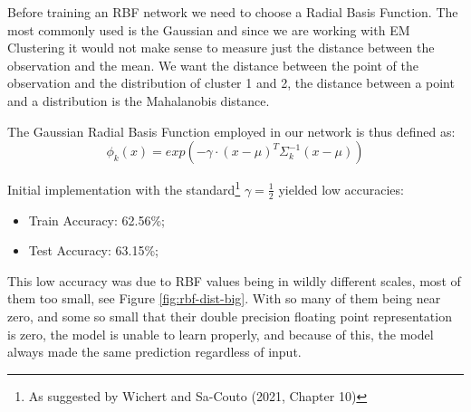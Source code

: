 \documentclass[11pt]{article}
\begin{document}
Before training an RBF network we need to choose a Radial Basis Function. The 
most commonly used is the Gaussian and since we are working with EM Clustering
it would not make sense to measure just the distance between the observation and
the mean. We want the distance between the point of the observation and the
distribution of cluster 1 and 2, the distance between a point and a distribution 
is the Mahalanobis distance.

The Gaussian Radial Basis Function employed in our network is thus defined as:
\begin{equation}
  \phi_k(x)=exp(-\gamma \cdot (x-\mu)^T\Sigma_k^{-1}(x-\mu))
\end{equation}

Initial implementation with the standard\footnote{ 
  As suggested by Wichert and Sa-Couto (2021, Chapter 10)
} 
$\gamma=\frac{1}{2}$ yielded low accuracies:
\begin{itemize}
    \item Train Accuracy: 62.56\%;
    \item Test Accuracy: 63.15\%;
\end{itemize}

This low accuracy was due to RBF values being in wildly different scales, most of
them too small, see Figure \ref{fig:rbf-dist-big}.
With so many of them being near zero, and some so small that their double
precision floating point representation is zero,
the model is unable to learn properly, and because of this, the model
always made the same prediction regardless of input.
\end{document}
